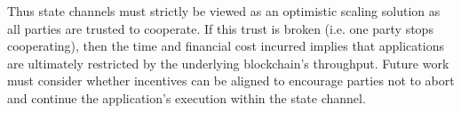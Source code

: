 \documentclass{llncs}
\begin{document}
	Thus state channels must strictly be viewed as an optimistic scaling solution as all parties are trusted to cooperate. 
	If this trust is broken (i.e. one party stops cooperating), then the time and financial cost incurred implies that applications are ultimately restricted by the underlying blockchain's throughput. 
	Future work must consider whether incentives can be aligned to encourage parties not to abort and continue the application's execution within the state channel.  
	
	
	
	
\end{document}
